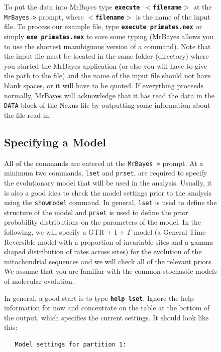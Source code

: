 \documentclass[12pt]{book}
\newcommand{\ttt}[1]{\texttt{#1}}
\newcommand{\tb}[1]{\ttt{\textbf{#1}}}
\begin{document}
\begin{figure}[h]
To put the data into MrBayes type \tb{execute $<$filename$>$} at the \ttt{MrBayes >} prompt, where
\tb{$<$filename$>$} is the name of the input file. To process our example file, type \tb{execute
primates.nex} or simply \tb{exe primates.nex} to save some typing (MrBayes allows you to use the
shortest unambiguous version of a command). Note that the input file must be located in the same
folder (directory) where you started the MrBayes application (or else you will have to give the
path to the file) and the name of the input file should not have blank spaces, or it will have to
be quoted. If everything proceeds normally, MrBayes will acknowledge that it has read the data in
the \ttt{DATA} block of the Nexus file by outputting some information about the file read in.

\subsection{Specifying a Model}

All of the commands are entered at the \ttt{MrBayes >} prompt. At a minimum two commands,
\ttt{lset} and \ttt{prset}, are required to specify the evolutionary model that will be used in the
analysis. Usually, it is also a good idea to check the model settings prior to the analysis using
the \ttt{showmodel} command. In general, \ttt{lset} is used to define the structure of the model
and \ttt{prset} is used to define the prior probability distributions on the parameters of the
model. In the following, we will specify a GTR + I + $\Gamma$ model (a General Time Reversible model
with a proportion of invariable sites and a gamma-shaped distribution of rates across sites) for
the evolution of the mitochondrial sequences and we will check all of the relevant priors. We
assume that you are familiar with the common stochastic models of molecular evolution.

In general, a good start is to type \tb{help lset}. Ignore the help information for now and
concentrate on the table at the bottom of the output, which specifies the current settings. It
should look like this:

\begin{singlespacing}
\footnotesize
\begin{verbatim}
   Model settings for partition 1:


\end{verbatim}
\end{singlespacing}
\end{figure}
\end{document}
